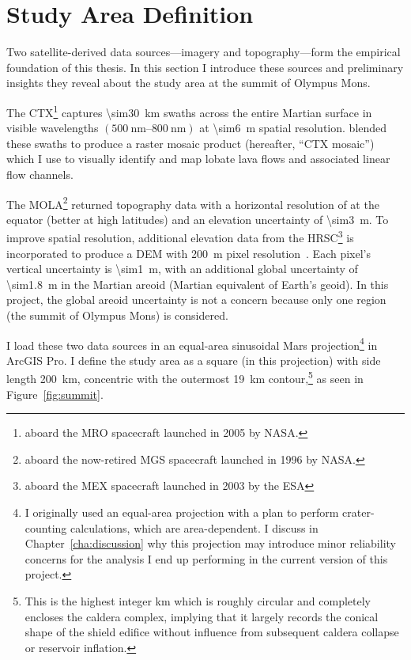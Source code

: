 \section{Study Area Definition}\label{sec:study-area}

Two satellite-derived data sources---imagery and topography---form the empirical foundation of this thesis. In this section I introduce these sources and preliminary insights they reveal about the study area at the summit of Olympus Mons.


The \acf{CTX}\footnote{aboard the \ac{MRO} spacecraft launched in 2005 by \acs{NASA}.} captures \qty{\sim30}{\km} swaths across the entire Martian surface in visible wavelengths $(\qtyrange{500}{800}{\nm})$ at \qty{\sim6}{\m} spatial resolution. \textcite{Dickson2018AGB} blended these swaths to produce a raster mosaic product (hereafter, ``\ac{CTX} mosaic'') which I use to visually identify and map lobate lava flows and associated linear flow channels.

The \acf{MOLA}\footnote{aboard the now-retired \ac{MGS} spacecraft launched in 1996 by \acs{NASA}.} returned topography data with a horizontal resolution of  at the equator (better at high latitudes) and an elevation uncertainty of \qty{\sim3}{\m}. To improve spatial resolution, additional elevation data from the \ac{HRSC}\footnote{aboard the \ac{MEX} spacecraft launched in 2003 by the \ac{ESA}} is incorporated to produce a \ac{DEM} with \qty{200}{\m} pixel resolution~\parencite{smith_mars_2001}. Each pixel's vertical uncertainty is \qty{\sim1}{\m}, with an additional global uncertainty of \qty{\sim1.8}{\m} in the Martian areoid (Martian equivalent of Earth's geoid). In this project, the global areoid uncertainty is not a concern because only one region (the summit of Olympus Mons) is considered.

I load these two data sources in an equal-area sinusoidal Mars projection\footnote{I originally used an equal-area projection with a plan to perform crater-counting calculations, which are area-dependent. I discuss in Chapter~\ref{cha:discussion} why this projection may introduce minor reliability concerns for the analysis I end up performing in the current version of this project.} in ArcGIS Pro. I define the study area as a square (in this projection) with side length \qty{200}{\km}, concentric with the outermost \qty{19}{\km} contour,\footnote{This is the highest integer \unit{km} which is roughly circular and completely encloses the caldera complex, implying that it largely records the conical shape of the shield edifice without influence from subsequent caldera collapse or reservoir inflation.} as seen in Figure~\ref{fig:summit}.

